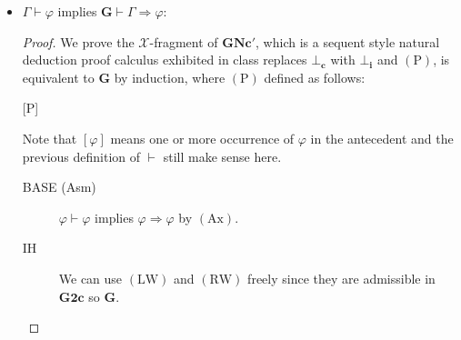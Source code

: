 \documentclass[12pt]{article}
\newcommand\A{\varphi}
\newcommand\B{\psi}
\newcommand\GG\Gamma
\newcommand\TO\Rightarrow
\newcommand\PC[1]{\mathbf{#1}}
\newcommand\AX{\textrm{Ax}}
\newcommand\LW{\textrm{LW}}
\newcommand\RW{\textrm{RW}}
\newcommand\EFQ{\bot_\mathbf{i}}
\newcommand\RAA{\bot_\mathbf{c}}
\newcommand\PLR{\mathrm{P}}
\begin{document}
\begin{enumerate}
\begin{enumerate}
\begin{itemize}
            \item $\GG\vdash\A$ implies $\PC{G}\vdash\GG\TO\A$:
            \begin{proof}
            We prove the $\mathcal{X}$-fragment of $\PC{GNc'}$, which is a sequent style natural deduction proof calculus exhibited in class replaces $\RAA$ with $\EFQ$ and $(\PLR)$, is equivalent to $\PC{G}$ by induction, where $(\PLR)$ defined as follows:
            \begin{prooftree*}
            \hypo{\GG,[\A\to\B]\vdash\A}
            [$\PLR$]{\GG\vdash\A}
            \end{prooftree*}
            Note that $[\A]$ means one or more occurrence of $\A$ in the antecedent and the previous definition of $\vdash$ still make sense here.
            
            \begin{description}
                \item[BASE (Asm)]
                $\A\vdash\A$ implies $\A\TO\A$ by $(\AX)$.
                \item[IH] We can use $(\LW)$ and $(\RW)$ freely since they are admissible in $\PC{G2c}$ so $\PC{G}$.
                

\end{description}
\end{proof}
\end{itemize}
\end{enumerate}
\end{enumerate}
\end{document}
